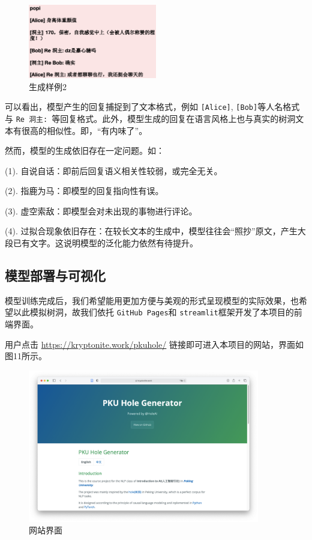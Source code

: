 \documentclass[12pt,a4paper]{article}
\begin{document}
\begin{figure}[!h]
        \centering
        \includegraphics[width=0.5\textwidth]{回复2.png}
        \caption{生成样例2}
\end{figure}

可以看出，模型产生的回复捕捉到了文本格式，例如 \verb|[Alice]|, \verb|[Bob]|等人名格式与 \verb|Re 洞主: |等回复格式。此外，模型生成的回复在语言风格上也与真实的树洞文本有很高的相似性。即，“有内味了”。

然而，模型的生成依旧存在一定问题。如：

(1). 自说自话：即前后回复语义相关性较弱，或完全无关。

(2). 指鹿为马：即模型的回复指向性有误。

(3). 虚空索敌：即模型会对未出现的事物进行评论。

(4). 过拟合现象依旧存在：在较长文本的生成中，模型往往会“照抄”原文，产生大段已有文字。这说明模型的泛化能力依然有待提升。

\subsection{模型部署与可视化}
模型训练完成后，我们希望能用更加方便与美观的形式呈现模型的实际效果，也希望以此模拟树洞，故我们依托 \verb|GitHub Pages|和 \verb|streamlit|框架开发了本项目的前端界面。

用户点击 \href{https://kryptonite.work/pkuhole/}{https://kryptonite.work/pkuhole/} 链接即可进入本项目的网站，界面如图11所示。

\begin{figure}[!h]
        \centering
        \includegraphics[width=0.9\textwidth]{界面1.png}
        \caption{网站界面}
\end{figure}
\end{document}
